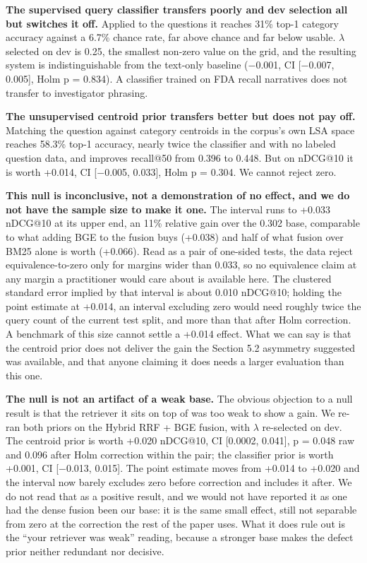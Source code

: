 \documentclass[runningheads]{llncs}
\begin{document}
\textbf{The supervised query classifier transfers poorly and dev selection all but switches it off.} Applied to the questions it reaches 31\% top-1 category accuracy against a 6.7\% chance rate, far above chance and far below usable. $\lambda$ selected on dev is 0.25, the smallest non-zero value on the grid, and the resulting system is indistinguishable from the text-only baseline ($-$0.001, CI [$-$0.007, 0.005], Holm p = 0.834). A classifier trained on FDA recall narratives does not transfer to investigator phrasing.

\textbf{The unsupervised centroid prior transfers better but does not pay off.} Matching the question against category centroids in the corpus's own LSA space reaches 58.3\% top-1 accuracy, nearly twice the classifier and with no labeled question data, and improves recall@50 from 0.396 to 0.448. But on nDCG@10 it is worth +0.014, CI [$-$0.005, 0.033], Holm p = 0.304. We cannot reject zero.

\textbf{This null is inconclusive, not a demonstration of no effect, and we do not have the sample size to make it one.} The interval runs to +0.033 nDCG@10 at its upper end, an 11\% relative gain over the 0.302 base, comparable to what adding BGE to the fusion buys (+0.038) and half of what fusion over BM25 alone is worth (+0.066). Read as a pair of one-sided tests, the data reject equivalence-to-zero only for margins wider than 0.033, so no equivalence claim at any margin a practitioner would care about is available here. The clustered standard error implied by that interval is about 0.010 nDCG@10; holding the point estimate at +0.014, an interval excluding zero would need roughly twice the query count of the current test split, and more than that after Holm correction. A benchmark of this size cannot settle a +0.014 effect. What we can say is that the centroid prior does not deliver the gain the Section 5.2 asymmetry suggested was available, and that anyone claiming it does needs a larger evaluation than this one.

\textbf{The null is not an artifact of a weak base.} The obvious objection to a null result is that the retriever it sits on top of was too weak to show a gain. We re-ran both priors on the Hybrid RRF + BGE fusion, with $\lambda$ re-selected on dev. The centroid prior is worth +0.020 nDCG@10, CI [0.0002, 0.041], p = 0.048 raw and 0.096 after Holm correction within the pair; the classifier prior is worth +0.001, CI [$-$0.013, 0.015]. The point estimate moves from +0.014 to +0.020 and the interval now barely excludes zero before correction and includes it after. We do not read that as a positive result, and we would not have reported it as one had the dense fusion been our base: it is the same small effect, still not separable from zero at the correction the rest of the paper uses. What it does rule out is the ``your retriever was weak'' reading, because a stronger base makes the defect prior neither redundant nor decisive.
\end{document}
